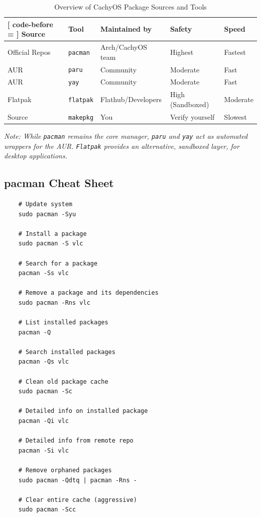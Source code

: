 \documentclass{article}
\newcommand{\code}[1]{\colorbox{codebg}{\texttt{#1}}}
\begin{document}
\begin{table}[h]
	\centering
	\small
	\caption{Overview of CachyOS Package Sources and Tools}
	\label{tab:package-managers}
	\vspace{0.5em} %
	\begin{NiceTabular}{lllll}[
		code-before = {
		}
		]
		\toprule
		\textbf{Source} & \textbf{Tool} & \textbf{Maintained by} & \textbf{Safety} & \textbf{Speed} \\
		\midrule
		Official Repos & \code{pacman}   & Arch/CachyOS team & Highest         & Fastest \\
		AUR            & \code{paru}     & Community          & Moderate        & Fast    \\
		AUR            & \code{yay}      & Community          & Moderate        & Fast    \\
		Flatpak        & \code{flatpak}  & Flathub/Developers & High (Sandboxed)& Moderate\\
		Source         & \code{makepkg}  & You                & Verify yourself & Slowest \\
		\bottomrule
	\end{NiceTabular}
	\smallskip
	\begin{flushleft}
		\textit{Note: While \code{pacman} remains the core manager, \code{paru} and \code{yay} act as automated wrappers for the AUR. \code{Flatpak} provides an alternative, sandboxed layer, for desktop applications. }
	\end{flushleft}
\end{table}

\subsection{pacman Cheat Sheet}

\begin{verbatim}
	# Update system
	sudo pacman -Syu
	
	# Install a package
	sudo pacman -S vlc
	
	# Search for a package
	pacman -Ss vlc
	
	# Remove a package and its dependencies
	sudo pacman -Rns vlc
	
	# List installed packages
	pacman -Q
	
	# Search installed packages
	pacman -Qs vlc
	
	# Clean old package cache
	sudo pacman -Sc
	
	# Detailed info on installed package
	pacman -Qi vlc
	
	# Detailed info from remote repo
	pacman -Si vlc
	
	# Remove orphaned packages
	sudo pacman -Qdtq | pacman -Rns -
	
	# Clear entire cache (aggressive)
	sudo pacman -Scc
\end{verbatim}
\end{document}
